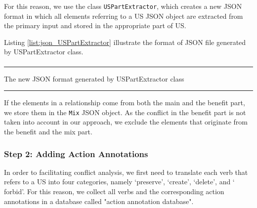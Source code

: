 For this reason, we use the class \texttt{USPartExtractor}, which creates a new JSON format in which all elements referring to a US JSON object are extracted from the primary input and stored in the appropriate part of US.

Listing \ref{list:json_USPartExtractor} illustrate the format of JSON file generated by USPartExtractor class.
\begin{MyListing}
	\paragraph{}
	\hrule
	\centering
	
	\caption{The new JSON format generated by USPartExtractor class}\label{list:json_USPartExtractor}
	\hrule
\end{MyListing}
If the elements in a relationship come from both the main and the benefit part, we store them in the \texttt{Mix} JSON object. As the conflict in the benefit part is not taken into account in our approach, we exclude the elements that originate from the benefit and the mix part.
\subsubsection*{Step 2: Adding Action Annotations}
In order to facilitating conflict analysis, we first need to translate each verb that refers to a US into four categories, namely ‘preserve’, ‘create’, ‘delete’, and ‘ forbid’. For this reason, we collect all verbs and the corresponding action annotations in a database called "action annotation database".

